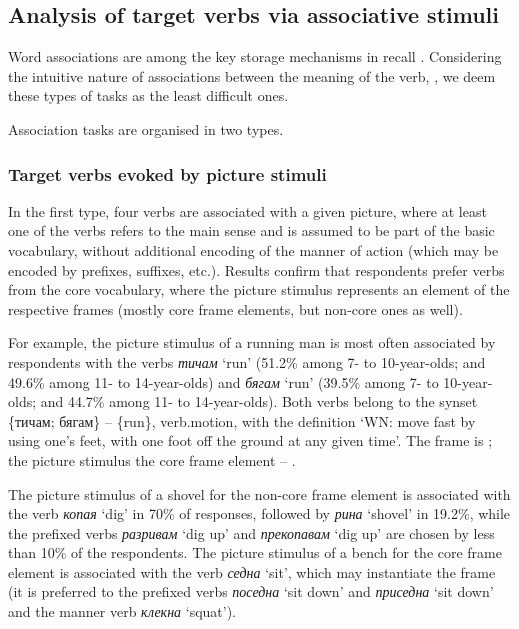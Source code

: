 \documentclass[output=paper,colorlinks,citecolor=brown]{langscibook}
\begin{document}
\subsection{Analysis of target verbs via associative stimuli}\label{subsect:4.2}

Word associations are among the key storage mechanisms in recall \citep{Glanzer1972}. Considering the intuitive nature of associations between the meaning of the verb, , we deem these types of tasks as the least difficult ones.

Association tasks are organised in two types. 

\subsubsection{Target verbs evoked by picture stimuli}

In the first type, four verbs are associated with a given picture, where at least one of the verbs refers to the main sense and is assumed to be part of the basic vocabulary, without additional encoding of the manner of action (which may be encoded by prefixes, suffixes, etc.). Results confirm that respondents prefer verbs from the core vocabulary, where the picture stimulus represents an element of the respective frames (mostly core frame elements, but non-core ones as well).

For example, the picture stimulus of a running man is most often associated by respondents with the verbs \textit{тичам} `run' (51.2\% among 7- to 10-year-olds; and 49.6\% among 11- to 14-year-olds) and \textit{бягам} `run' (39.5\% among 7- to 10-year-olds; and 44.7\% among 11- to 14-year-olds). Both verbs belong to the synset \{тичам; бягам\} -- \{run\}, verb.motion, with the definition `WN: move fast by using one's feet, with one foot off the ground at any given time’. The frame is ; the picture stimulus  the core frame element -- .

The picture stimulus of a shovel for the non-core frame element  is associated with the verb \textit{копая} `dig' in 70\% of responses, followed by \textit{рина} `shovel' in 19.2\%, while the prefixed verbs \textit{разривам} `dig up' and \textit{прекопавам} `dig up' are chosen by less than 10\% of the respondents. The picture stimulus of a bench for the core frame element  is associated with the verb \textit{седна} `sit', which may instantiate the frame  (it is preferred to the prefixed verbs \textit{поседна} `sit down' and \textit{приседна} `sit down' and the manner verb \textit{клекна} `squat').
\end{document}
